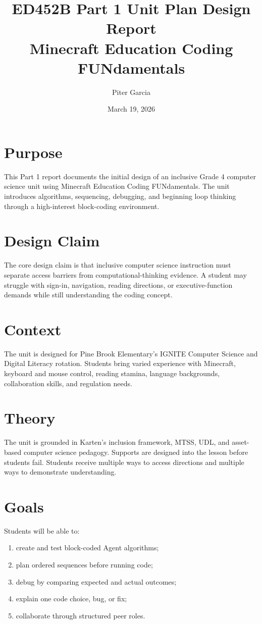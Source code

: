 \documentclass[12pt]{article}
\title{ED452B Part 1 Unit Plan Design Report\\Minecraft Education Coding FUNdamentals}
\author{Piter Garcia}
\date{March 19, 2026}
\begin{document}
\maketitle

\section{Purpose}
This Part 1 report documents the initial design of an inclusive Grade 4 computer science unit using Minecraft Education Coding FUNdamentals. The unit introduces algorithms, sequencing, debugging, and beginning loop thinking through a high-interest block-coding environment.

\section{Design Claim}
The core design claim is that inclusive computer science instruction must separate access barriers from computational-thinking evidence. A student may struggle with sign-in, navigation, reading directions, or executive-function demands while still understanding the coding concept.

\section{Context}
The unit is designed for Pine Brook Elementary's IGNITE Computer Science and Digital Literacy rotation. Students bring varied experience with Minecraft, keyboard and mouse control, reading stamina, language backgrounds, collaboration skills, and regulation needs.

\section{Theory}
The unit is grounded in Karten's inclusion framework, MTSS, UDL, and asset-based computer science pedagogy. Supports are designed into the lesson before students fail. Students receive multiple ways to access directions and multiple ways to demonstrate understanding.

\section{Goals}
Students will be able to:
\begin{enumerate}
\item create and test block-coded Agent algorithms;
\item plan ordered sequences before running code;
\item debug by comparing expected and actual outcomes;
\item explain one code choice, bug, or fix;
\item collaborate through structured peer roles.
\end{enumerate}
\end{document}
